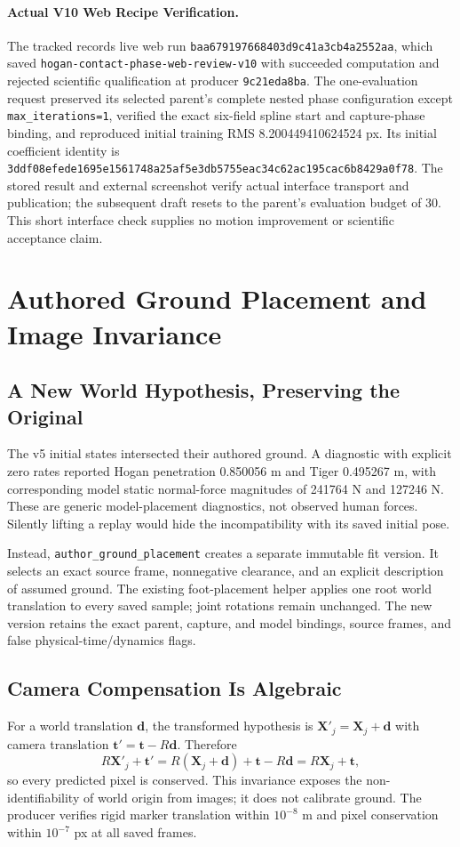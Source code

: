 \documentclass[11pt,letterpaper]{article}
\newcommand{\code}[1]{\nolinkurl{#1}}
\newcommand{\hash}[1]{{\footnotesize\nolinkurl{#1}}}
\newcommand{\reportsection}[1]{\section{#1}}
\begin{document}
\paragraph{Actual V10 Web Recipe Verification.}
The tracked  records live web run
\code{baa679197668403d9c41a3cb4a2552aa}, which saved
\code{hogan-contact-phase-web-review-v10} with succeeded computation and
rejected scientific qualification at producer \code{9c21eda8ba}.
The one-evaluation request preserved its selected parent's complete nested
phase configuration except \code{max_iterations=1}, verified the exact
six-field spline start and capture-phase binding, and reproduced initial
training RMS 8.200449410624524 px. Its initial coefficient identity is
\hash{3ddf08efede1695e1561748a25af5e3db5755eac34c62ac195cac6b8429a0f78}.
The stored result and external 
screenshot verify actual interface transport and publication; the subsequent
draft resets to the parent's evaluation budget of 30. This short interface
check supplies no motion improvement or scientific acceptance claim.

\reportsection{Authored Ground Placement and Image Invariance}
\subsection{A New World Hypothesis, Preserving the Original}
The v5 initial states intersected their authored ground. A diagnostic with
explicit zero rates reported Hogan penetration 0.850056 m and Tiger 0.495267 m,
with corresponding model static normal-force magnitudes of 241764 N and
127246 N. These are generic model-placement diagnostics, not observed human
forces. Silently lifting a replay would hide the incompatibility with its saved
initial pose.

Instead, \code{author_ground_placement} creates a separate immutable fit
version. It selects an exact source frame, nonnegative clearance, and an
explicit description of assumed ground. The existing foot-placement helper
applies one root world translation to every saved sample; joint rotations
remain unchanged. The new version retains the exact parent, capture, and model
bindings, source frames, and false physical-time/dynamics flags.

\subsection{Camera Compensation Is Algebraic}
For a world translation $\mathbf d$, the transformed hypothesis is
$\mathbf X'_j=\mathbf X_j+\mathbf d$ with camera translation
$\mathbf t'=\mathbf t-R\mathbf d$. Therefore
\begin{equation}
 R\mathbf X'_j+\mathbf t'
 =R(\mathbf X_j+\mathbf d)+\mathbf t-R\mathbf d
 =R\mathbf X_j+\mathbf t,
\end{equation}
so every predicted pixel is conserved. This invariance exposes the
non-identifiability of world origin from images; it does not calibrate ground.
The producer verifies rigid marker translation within $10^{-8}$ m and pixel
conservation within $10^{-7}$ px at all saved frames.
\end{document}

